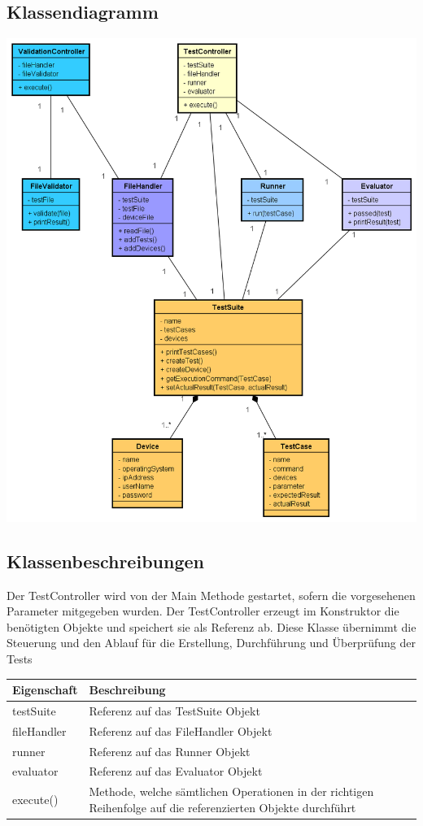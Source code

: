 \documentclass[a4,12pt]{scrartcl}
\begin{document}
\subsection{Klassendiagramm}
\includegraphics[width=1.02\textwidth]{./pictures/classdiagram.png}
\subsection{Klassenbeschreibungen}
Der TestController wird von der Main Methode gestartet, sofern die vorgesehenen Parameter mitgegeben wurden. Der TestController erzeugt im Konstruktor die benötigten Objekte und speichert sie als Referenz ab. Diese Klasse übernimmt die Steuerung und den Ablauf für die Erstellung, Durchführung und Überprüfung der Tests
\noindent \begin{table}[H]
\centering
    \begin{tabular}{@{}l p{12cm} @{}}\toprule    
    {Eigenschaft} & {Beschreibung}\\ \midrule
    testSuite & Referenz auf das TestSuite Objekt  \\       
    fileHandler & Referenz auf das FileHandler Objekt \\
    runner & Referenz auf das Runner Objekt\\
    evaluator & Referenz auf das Evaluator Objekt\\
    execute() & Methode, welche sämtlichen Operationen in der richtigen Reihenfolge auf die referenzierten Objekte durchführt\\
    \bottomrule
    \end{tabular}
\end{table}
\end{document}
